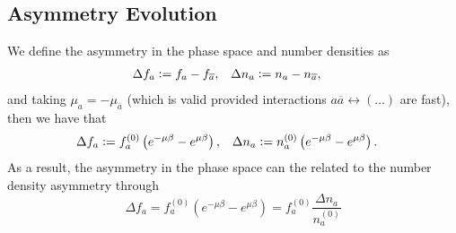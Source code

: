 \documentclass{scrartcl}
\begin{document}
\subsection{Asymmetry Evolution}%
\label{sec:asymmetry_evolution}

We define the asymmetry in the phase space and number densities as
\begin{align}
  \Delta f_a & \vcentcolon= f_a - f_{\overline a}, &
  \Delta n_a & \vcentcolon= n_a - n_{\overline a},
\end{align}
and taking \(\mu_a = - \mu_{\overline a}\) (which is valid provided
interactions \(a \overline a \leftrightarrow (\dots)\) are fast), then we have
that
\begin{align}
  \Delta f_a & \vcentcolon= f_a^{(0)} \left( e^{-\mu \beta} - e^{\mu \beta} \right), &
  \Delta n_a & \vcentcolon= n_a^{(0)} \left( e^{-\mu \beta} - e^{\mu \beta} \right).
\end{align}
As a result, the asymmetry in the phase space can the related to the number
density asymmetry through
\begin{equation}
  \Delta f_a = f_a^{(0)} \left( e^{-\mu \beta} - e^{\mu \beta} \right)
  = f_a^{(0)} \frac{\Delta n_a}{n_a^{(0)}}
\end{equation}
\end{document}

